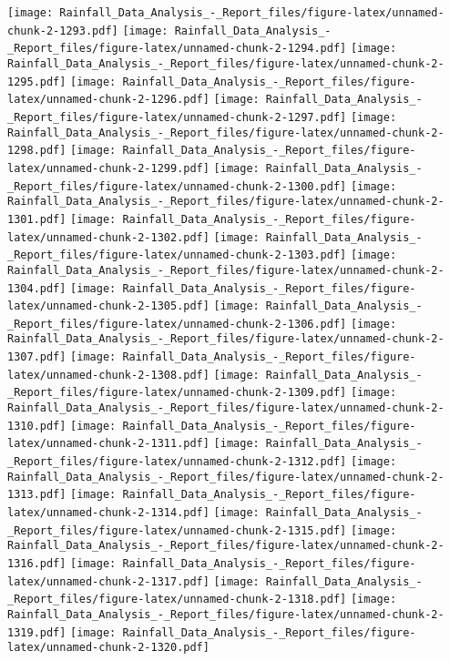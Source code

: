 \documentclass[
]{article}
\begin{document}
\texttt{[image: Rainfall\_Data\_Analysis\_-\_Report\_files/figure-latex/unnamed-chunk-2-1293.pdf]}
\texttt{[image: Rainfall\_Data\_Analysis\_-\_Report\_files/figure-latex/unnamed-chunk-2-1294.pdf]}
\texttt{[image: Rainfall\_Data\_Analysis\_-\_Report\_files/figure-latex/unnamed-chunk-2-1295.pdf]}
\texttt{[image: Rainfall\_Data\_Analysis\_-\_Report\_files/figure-latex/unnamed-chunk-2-1296.pdf]}
\texttt{[image: Rainfall\_Data\_Analysis\_-\_Report\_files/figure-latex/unnamed-chunk-2-1297.pdf]}
\texttt{[image: Rainfall\_Data\_Analysis\_-\_Report\_files/figure-latex/unnamed-chunk-2-1298.pdf]}
\texttt{[image: Rainfall\_Data\_Analysis\_-\_Report\_files/figure-latex/unnamed-chunk-2-1299.pdf]}
\texttt{[image: Rainfall\_Data\_Analysis\_-\_Report\_files/figure-latex/unnamed-chunk-2-1300.pdf]}
\texttt{[image: Rainfall\_Data\_Analysis\_-\_Report\_files/figure-latex/unnamed-chunk-2-1301.pdf]}
\texttt{[image: Rainfall\_Data\_Analysis\_-\_Report\_files/figure-latex/unnamed-chunk-2-1302.pdf]}
\texttt{[image: Rainfall\_Data\_Analysis\_-\_Report\_files/figure-latex/unnamed-chunk-2-1303.pdf]}
\texttt{[image: Rainfall\_Data\_Analysis\_-\_Report\_files/figure-latex/unnamed-chunk-2-1304.pdf]}
\texttt{[image: Rainfall\_Data\_Analysis\_-\_Report\_files/figure-latex/unnamed-chunk-2-1305.pdf]}
\texttt{[image: Rainfall\_Data\_Analysis\_-\_Report\_files/figure-latex/unnamed-chunk-2-1306.pdf]}
\texttt{[image: Rainfall\_Data\_Analysis\_-\_Report\_files/figure-latex/unnamed-chunk-2-1307.pdf]}
\texttt{[image: Rainfall\_Data\_Analysis\_-\_Report\_files/figure-latex/unnamed-chunk-2-1308.pdf]}
\texttt{[image: Rainfall\_Data\_Analysis\_-\_Report\_files/figure-latex/unnamed-chunk-2-1309.pdf]}
\texttt{[image: Rainfall\_Data\_Analysis\_-\_Report\_files/figure-latex/unnamed-chunk-2-1310.pdf]}
\texttt{[image: Rainfall\_Data\_Analysis\_-\_Report\_files/figure-latex/unnamed-chunk-2-1311.pdf]}
\texttt{[image: Rainfall\_Data\_Analysis\_-\_Report\_files/figure-latex/unnamed-chunk-2-1312.pdf]}
\texttt{[image: Rainfall\_Data\_Analysis\_-\_Report\_files/figure-latex/unnamed-chunk-2-1313.pdf]}
\texttt{[image: Rainfall\_Data\_Analysis\_-\_Report\_files/figure-latex/unnamed-chunk-2-1314.pdf]}
\texttt{[image: Rainfall\_Data\_Analysis\_-\_Report\_files/figure-latex/unnamed-chunk-2-1315.pdf]}
\texttt{[image: Rainfall\_Data\_Analysis\_-\_Report\_files/figure-latex/unnamed-chunk-2-1316.pdf]}
\texttt{[image: Rainfall\_Data\_Analysis\_-\_Report\_files/figure-latex/unnamed-chunk-2-1317.pdf]}
\texttt{[image: Rainfall\_Data\_Analysis\_-\_Report\_files/figure-latex/unnamed-chunk-2-1318.pdf]}
\texttt{[image: Rainfall\_Data\_Analysis\_-\_Report\_files/figure-latex/unnamed-chunk-2-1319.pdf]}
\texttt{[image: Rainfall\_Data\_Analysis\_-\_Report\_files/figure-latex/unnamed-chunk-2-1320.pdf]}
\end{document}
